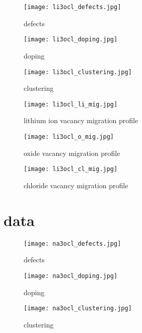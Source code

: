 \documentclass[10pt,a4paper]{article}
\begin{document}
\begin{figure}[h!]
\centering
\texttt{[image: li3ocl\_defects.jpg]}
\caption{\label{li3ocl_defects.jpg}  defects}
\end{figure}

\begin{figure}[h!]
\centering
\texttt{[image: li3ocl\_doping.jpg]}
\caption{\label{li3ocl_doping.jpg}  doping}
\end{figure}

\begin{figure}[h]
\centering
\texttt{[image: li3ocl\_clustering.jpg]}
\caption{\label{li3ocl_clustering.jpg}  clustering}
\end{figure}

\begin{figure}[h!]
\centering
\texttt{[image: li3ocl\_li\_mig.jpg]}
\caption{\label{li3ocl_li_mig.jpg}  lithium ion vacancy migration profile}
\end{figure}

\begin{figure}[h!]
\centering
\texttt{[image: li3ocl\_o\_mig.jpg]}
\caption{\label{li3ocl_o_mig.jpg}  oxide vacancy migration profile}
\end{figure}

\begin{figure}[h!]
\centering
\texttt{[image: li3ocl\_cl\_mig.jpg]}
\caption{\label{li3ocl_cl_mig.jpg}  chloride vacancy migration profile}
\end{figure}

\clearpage

\section{ data}

\begin{figure}[h]
\centering
\texttt{[image: na3ocl\_defects.jpg]}
\caption{\label{na3ocl_doping.jpg}  defects}
\end{figure}

\begin{figure}[h]
\centering
\texttt{[image: na3ocl\_doping.jpg]}
\caption{\label{na3ocl_doping.jpg}  doping}
\end{figure}

\begin{figure}[h]
\centering
\texttt{[image: na3ocl\_clustering.jpg]}
\caption{\label{na3ocl_clustering.jpg}  clustering}
\end{figure}
\end{document}

